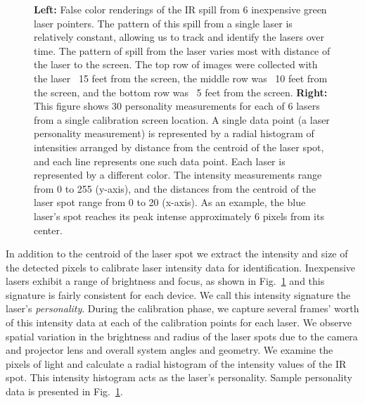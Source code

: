 \documentclass[runningheads,a4paper]{llncs}
\begin{document}
\begin{figure}[t]
\vspace{-0.1in}
  \caption{\label{figure:lasers} 
\textbf{Left:} False color renderings of the IR spill from  6
inexpensive green laser
pointers.  The pattern of this spill from a single laser is relatively constant, allowing
us to track and identify the lasers over time.  The pattern of spill
from the laser varies most with distance of the laser to the screen.
The top row of images were collected with the laser ~15 feet from the
screen, 
 the middle row was ~10 feet from the screen, 
and the bottom
row was ~5 feet from the screen. 
\newline
\textbf{Right:} This figure shows 30
  personality measurements for each of 6 lasers from a single
  calibration screen location. A single data point (a laser
  personality measurement) is represented by a radial histogram of
  intensities arranged by distance from the centroid of the laser
  spot, and each line represents one such data point. Each laser is
  represented by a different color. The intensity measurements range
  from 0 to 255 (y-axis), and the distances from the centroid of the
  laser spot range from 0 to 20 (x-axis). As an example, the blue
  laser's spot reaches its peak intense approximately 6 pixels from
  its center.
\vspace{-0.1in}
}
\end{figure}


In addition to the centroid of the laser spot we extract the intensity
and size of the detected pixels to calibrate laser intensity data for
identification.  Inexpensive lasers exhibit a range of brightness and
focus, as shown in Fig.~\ref{figure:lasers} and this signature is
fairly consistent for each device.
We call this intensity signature the laser's \textit{personality}.
During the calibration phase, we capture several frames' worth of this
intensity data at each of the calibration points for each laser.  We
observe spatial variation in the brightness and radius of the laser
spots due to the camera and projector lens and overall system angles
and geometry.  We examine the pixels of light and calculate a radial
histogram of the intensity values of the IR spot.
This intensity histogram acts as the laser's
personality.
Sample personality data is presented in
Fig.~\ref{figure:lasers}.
\end{document}
